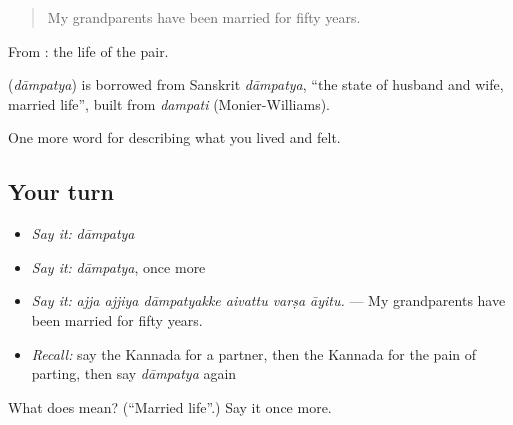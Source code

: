 \begin{quote}
My grandparents have been married for fifty years.
\end{quote}

From : the life of the pair.

\begin{cousinweb}
\textbf{} (\emph{dāmpatya}) is borrowed from Sanskrit \emph{dāmpatya}, \textquotedblleft{}the state of husband and wife, married life\textquotedblright{}, built from \emph{dampati} (Monier-Williams).
\end{cousinweb}

\begin{grammarlens}[title={What you've built}]
One more word for describing what you lived and felt.
\end{grammarlens}

\subsection*{Your turn}
\begin{itemize}
\raggedright
  \item \emph{Say it:} \emph{dāmpatya}
  \item \emph{Say it:} \emph{dāmpatya}, once more
  \item \emph{Say it:} \emph{ajja ajjiya dāmpatyakke aivattu varṣa āyitu.} — My grandparents have been married for fifty years.
  \item \emph{Recall:} say the Kannada for a partner, then the Kannada for the pain of parting, then say \emph{dāmpatya} again
\end{itemize}

\begin{tcolorbox}[breakable,colback=teal!4,colframe=teal!35!black,title={Before you move on}]
What does  mean? (\textquotedblleft{}Married life\textquotedblright{}.) Say it once more.
\end{tcolorbox}
